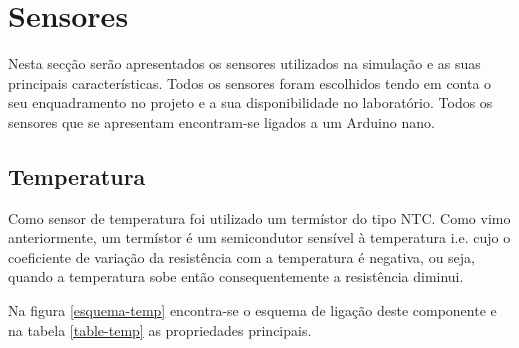 \newpage
\section{Sensores}

Nesta secção serão apresentados os sensores utilizados na simulação e as suas principais características. Todos os sensores foram escolhidos tendo em conta o seu enquadramento no projeto e a sua disponibilidade no laboratório. Todos os sensores que se apresentam encontram-se ligados a um Arduino nano. 


\subsection{Temperatura}

Como sensor de temperatura foi utilizado um termístor do tipo \ac{NTC}. Como vimo anteriormente, um termístor é um semicondutor sensível à temperatura i.e. cujo o coeficiente de variação da resistência com a temperatura é negativa, ou seja, quando a temperatura sobe então consequentemente a resistência diminui. 

Na figura \ref{esquema-temp} encontra-se o esquema de ligação deste componente e na tabela \ref{table-temp} as propriedades principais. 

